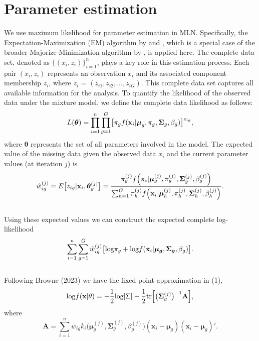 \documentclass[11pt]{article}
\begin{document}
\section{Parameter estimation}
We use maximum likelihood for parameter estimation in MLN. Specifically, the Expectation-Maximization (EM) algorithm by \cite{bouveyron2014model} and \cite{browne2022revitalizing}, which is a special case of the broader Majorize-Minimization algorithm by \cite{hunter2004tutorial}, is applied here. The complete data set, denoted as $\{(x_i,z_i)\}_{i=1}^n$, plays a key role in this estimation process. Each pair $(x_i, z_i)$ represents an observation $x_i$ and its associated component membership $z_i$, where $z_i$ = $(z_{i1},z_{i2},...,z_{iG})$. This complete data set captures all available information for the analysis. To quantify the likelihood of the observed data under the mixture model, we define the complete data likelihood as follows:
$$L(\boldsymbol{\theta}) = \prod_{i=1}^n\prod_{g=1}^{G} \bigl[\pi_gf(\bold{x}_i|\boldsymbol{\mu}_g,\pi_g,\boldsymbol{\Sigma}_g,\beta_g)\bigr]^{z_{ig}},$$
where $\boldsymbol{\theta}$ represents the set of all parameters involved in the model. The expected value of the missing data given the observed data $x_i$ and the current parameter values (at iteration $j$) is 
\\
$$\hat{w}_{ig}^{(j)} = E\bigl[z_{ig}|\bold{x}_i,\boldsymbol{\theta}_g^{(j)}\bigr] = \frac{\pi_g^{(j)}f\Bigl(\bold{x}_i|\boldsymbol{\mu}_g^{(j)},\pi_g^{(j)},\boldsymbol{\Sigma}_g^{(j)},\beta_g^{(j)}\Bigr)}{\sum_{h=1}^G\pi_h^{(j)}f\Bigl(\bold{x}_i|\boldsymbol{\mu}_h^{(j)},\pi_h^{(j)},\boldsymbol{\Sigma}_h^{(j)},\beta_h^{(j)}\Bigr)}.$$
\\
Using these expected values we can construct the expected complete log-likelihood
\\
\begin{equation}
\sum_{i=1}^n\sum_{g=1}^G\hat{w}_{ig}^{(j)}\bigl[\text{log}\pi_g+\text{log}f(\bold{x}_i|\boldsymbol{\mu_g},\boldsymbol{\Sigma_g},\beta_g)\bigr].
\end{equation}
\\ 
Following Browne (2023) we have the fixed point approximation in (1), 
\\
\begin{equation}
\text{log}f(\bold{x}|\bold{\theta}) = -\frac{1}{2}\text{log}|\Sigma|-\frac{1}{2} \text{tr}\Bigl[\bigl(\boldsymbol{\Sigma}_g^{(j)}\bigr)^{-1}\mathbf{A}\Bigr],
\end{equation}
where $$\mathbf{A} = \sum_{i=1}^{n}w_{ig}k_i\bigl(\boldsymbol{\mu}_g^{(j)},\boldsymbol{\Sigma}_g^{(j)},\beta_g^{(j)}\bigr)(\boldsymbol{x}_i-\boldsymbol{\mu}_g)(\boldsymbol{x}_i-\boldsymbol{\mu}_g)'.$$
\end{document}
